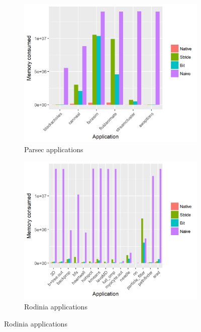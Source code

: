 \documentclass[12pt,twoside]{reedthesis}
\begin{document}
		\begin{figure}
			\caption{Memory compression of applications}
			\label{fig:mem-comp-plot}
			\begin{subfigure}[b]{0.6\textwidth}
				\caption{Parsec applications}
				\includegraphics[scale=0.7]{plots/mem_parsec_plot.png}
			\end{subfigure}
				\begin{subfigure}[b]{0.6\textwidth}
					\caption{Rodinia applications}
					\includegraphics[scale=0.7]{plots/mem_rodinia_plot.png}
			\end{subfigure}
		\end{figure}
	
\end{document}
